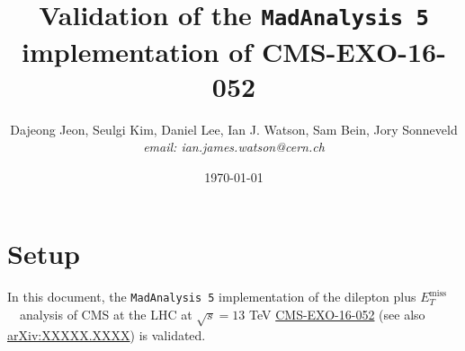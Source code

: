 \documentclass[12pt,A4paper]{article}
\title{Validation of the \texttt{MadAnalysis 5} implementation of CMS-EXO-16-052}
\author{Dajeong Jeon, Seulgi Kim, Daniel Lee, Ian J. Watson, Sam Bein, Jory Sonneveld \\
\normalsize {\it email: ian.james.watson@cern.ch}
\date{\today}
}
\newcommand{\xspace}{~}
\newcommand{\met}{\ensuremath{E_{T}^\mathrm{miss}}\xspace}
\begin{document}
        \maketitle


\section{Setup}
In this document, the \texttt{MadAnalysis 5} implementation of the
dilepton plus \met\ analysis of CMS at the LHC at
$\sqrt{s}=13$ TeV
\href{http://cms-results.web.cern.ch/cms-results/public-results/preliminary-results/EXO-16-052/}{CMS-EXO-16-052}
(see also \href{http://arxiv.org/abs/XXXXX.XXXX}{arXiv:XXXXX.XXXX}) is
validated.
\end{document}
